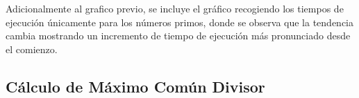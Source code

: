 \begin{figure}[H]
\end{figure}

Adicionalmente al grafico previo, se incluye el gráfico recogiendo los tiempos de ejecución únicamente para los números primos, donde se observa que la tendencia cambia mostrando un incremento de tiempo de ejecución más pronunciado desde el comienzo.
\begin{figure}[H]
\end{figure}

\subsection{Cálculo de Máximo Común Divisor}

